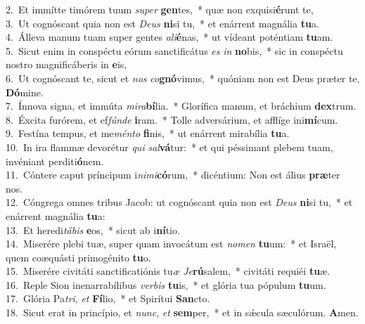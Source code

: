{2.~}Et immítte timórem tuum \textit{su}\textit{per} \textbf{gen}tes,~* quæ non exquisi\textbf{é}runt te,\\
{3.~}Ut cognóscant quia non est \textit{De}\textit{us} \textbf{ni}si tu,~* et enárrent magnália \textbf{tu}a.\\
{4.~}Álleva manum tuam super gentes \textit{a}\textit{li}\textbf{é}nas,~* ut vídeant poténtiam \textbf{tu}am.\\
{5.~}Sicut enim in conspéctu eórum sanctificátus \textit{es} \textit{in} \textbf{no}bis,~* sic in conspéctu nostro magnificáberis in \textbf{e}is,\\
{6.~}Ut cognóscant te, sicut et \textit{nos} \textit{co}\textbf{gnó}vimus,~* quóniam non est Deus præter te, \textbf{Dó}mine.\\
{7.~}Ínnova signa, et immúta \textit{mi}\textit{ra}\textbf{bí}lia.~* Glorífica manum, et bráchium \textbf{dex}trum.\\
{8.~}Éxcita furórem, et ef\textit{fún}\textit{de} \textbf{i}ram.~* Tolle adversárium, et afflíge ini\textbf{mí}cum.\\
{9.~}Festína tempus, et me\textit{mén}\textit{to} \textbf{fi}nis,~* ut enárrent mirabília \textbf{tu}a.\\
{10.~}In ira flammæ devorétur \textit{qui} \textit{sal}\textbf{vá}tur:~* et qui péssimant plebem tuam, invéniant perditi\textbf{ó}nem.\\
{11.~}Cóntere caput príncipum i\textit{ni}\textit{mi}\textbf{có}rum,~* dicéntium: Non est álius \textbf{præ}ter nos.\\
{12.~}Cóngrega omnes tribus Jacob: ut cognóscant quia non est \textit{De}\textit{us} \textbf{ni}si tu,~* et enárrent magnália \textbf{tu}a:\\
{13.~}Et heredi\textit{tá}\textit{bis} \textbf{e}os,~* sicut ab i\textbf{ní}tio.\\
{14.~}Miserére plebi tuæ, super quam invocátum est \textit{no}\textit{men} \textbf{tu}um:~* et Israël, quem coæquásti primogénito \textbf{tu}o.\\
{15.~}Miserére civitáti sanctificatiónis tu\textit{æ} \textit{Je}\textbf{rú}salem,~* civitáti requiéi \textbf{tu}æ.\\
{16.~}Reple Sion inenarrabílibus \textit{ver}\textit{bis} \textbf{tu}is,~* et glória tua pópulum \textbf{tu}um.\\
{17.~}Glória Pa\textit{tri}, \textit{et} \textbf{Fí}lio,~* et Spirítui \textbf{San}cto.\\
{18.~}Sicut erat in princípio, et \textit{nunc}, \textit{et} \textbf{sem}per,~* et in sǽcula sæculórum. \textbf{A}men.\\
